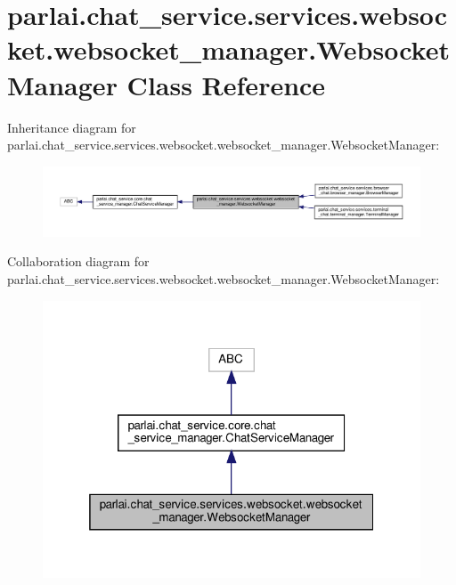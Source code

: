\hypertarget{classparlai_1_1chat__service_1_1services_1_1websocket_1_1websocket__manager_1_1WebsocketManager}{}\section{parlai.\+chat\+\_\+service.\+services.\+websocket.\+websocket\+\_\+manager.\+Websocket\+Manager Class Reference}
\label{classparlai_1_1chat__service_1_1services_1_1websocket_1_1websocket__manager_1_1WebsocketManager}


Inheritance diagram for parlai.\+chat\+\_\+service.\+services.\+websocket.\+websocket\+\_\+manager.\+Websocket\+Manager\+:
\nopagebreak
\begin{figure}[H]
\begin{center}
\leavevmode
\includegraphics[width=350pt]{d0/d91/classparlai_1_1chat__service_1_1services_1_1websocket_1_1websocket__manager_1_1WebsocketManager__inherit__graph}
\end{center}
\end{figure}


Collaboration diagram for parlai.\+chat\+\_\+service.\+services.\+websocket.\+websocket\+\_\+manager.\+Websocket\+Manager\+:
\nopagebreak
\begin{figure}[H]
\begin{center}
\leavevmode
\includegraphics[width=319pt]{d6/d77/classparlai_1_1chat__service_1_1services_1_1websocket_1_1websocket__manager_1_1WebsocketManager__coll__graph}
\end{center}
\end{figure}
